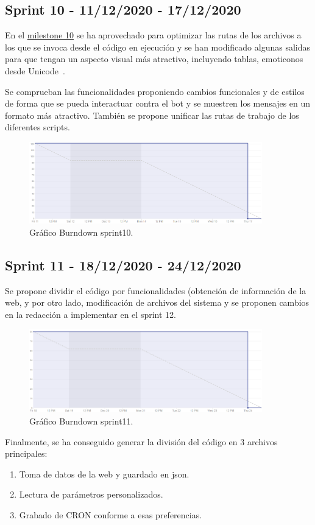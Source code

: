 \subsection{Sprint 10 - 11/12/2020 - 17/12/2020}
En el \href{https://github.com/davidelinformatico/TFG/milestone/10?closed=1}{milestone 10} se ha aprovechado para optimizar las rutas de los archivos a los que se invoca desde el código en ejecución y se han modificado algunas salidas para que tengan un aspecto visual más atractivo, incluyendo tablas, emoticonos desde Unicode~\cite{misc:UnicodeWikipedia}.

Se comprueban las funcionalidades proponiendo cambios funcionales y de estilos de forma que se pueda interactuar contra el bot y se muestren los mensajes en un formato más atractivo. También se propone unificar las rutas de trabajo de los diferentes scripts.

\begin{figure}[H]
    \centering
    \includegraphics[width=0.9\textwidth]{img/BurnDown/10.PNG}
    \caption{Gráfico Burndown sprint10. } \label{BD10}
\end{figure}

\subsection{Sprint 11 - 18/12/2020 - 24/12/2020}
Se propone dividir el código por funcionalidades (obtención de información de la web, y por otro lado, modificación de archivos del sistema y se proponen cambios en la redacción a implementar en el sprint 12.
\begin{figure}[h]
    \centering
    \includegraphics[width=0.9\textwidth]{img/BurnDown/11.PNG}
    \caption{Gráfico Burndown sprint11. } \label{BD11}
\end{figure}
Finalmente, se ha conseguido generar la división del código en 3 archivos principales:
\begin{enumerate}
    \item Toma de datos de la web y guardado en json.
    \item Lectura de parámetros personalizados.
    \item Grabado de CRON conforme a esas preferencias.
\end{enumerate}

